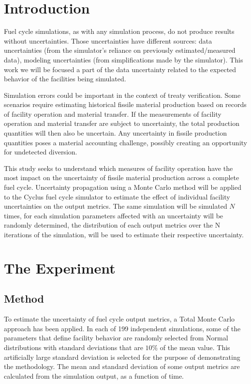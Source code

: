 \documentclass{anstrans}
\title{}
\author{Baptiste Mouginot,$^{*}$ Kathryn Mummah,$^{*}$ Paul P.H.  Wilson$^{*}$}
\institute{
$^{*}$University of Wisconsin-Madison, WI
}
\begin{document}
\section{Introduction}

Fuel cycle simulations, as with any simulation process, do not produce results
without uncertainties.  Those uncertainties have different sources: data uncertainties (from
the simulator's reliance on previously estimated/measured data), modeling
uncertainties (from simplifications made by the simulator). This work we will be
focused a part of the data uncertainty related to the expected behavior of the
facilities being simulated.

Simulation errors could be important in the context of treaty verification.
Some scenarios require estimating historical fissile material production based
on records of facility operation and material transfer.  If the measurements of
facility operation and material transfer are subject to uncertainty, the total
production quantities will then also be uncertain.  Any uncertainty in fissile
production quantities poses a material accounting challenge, possibly creating
an opportunity for undetected diversion.  

This study seeks to understand which measures of facility operation have the
most impact on the uncertainty of fissile material production across a complete
fuel cycle.  Uncertainty propagation using a Monte Carlo method will be applied
to the Cyclus fuel cycle simulator \cite{cyclus} to estimate the effect of
individual facility uncertainties on the output metrics. The same simulation
will be simulated $N$ times, for each simulation parameters affected with an
uncertainty will be randomly determined, the distribution of each output metrics
over the N iterations of the simulation, will be used to estimate their
respective uncertainty.

\section{The Experiment}

\subsection{Method}

To estimate the uncertainty of fuel cycle output metrics, a Total Monte
Carlo approach has been applied.  In each of 199 independent simulations,
some of the parameters that define facility behavior are randomly selected
from Normal distributions with standard deviations that are $10\%$ of the mean
value.  This artificially large standard deviation is selected for the purpose
of demonstrating the methodology.  The mean and standard deviation of some
output metrics are calculated from the simulation output, as a function of time.
\end{document}
